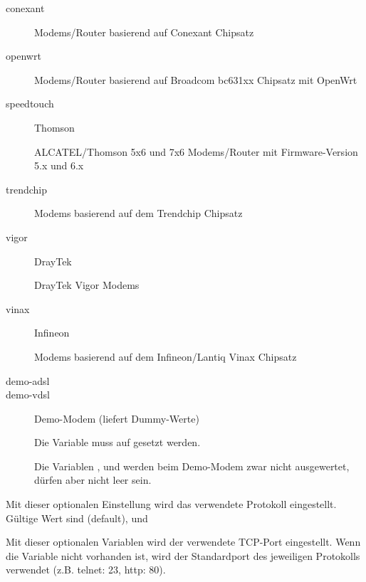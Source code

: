 \begin{description}
\begin{description}
\item[conexant] 

  Modems/Router basierend auf Conexant Chipsatz

\item[openwrt] 

  Modems/Router basierend auf Broadcom bc631xx Chipsatz mit OpenWrt

\item[speedtouch] Thomson 

  ALCATEL/Thomson 5x6 und 7x6 Modems/Router mit Firmware-Version 5.x und 6.x

\item[trendchip] 

  Modems basierend auf dem Trendchip Chipsatz

\item[vigor] DrayTek 

  DrayTek Vigor Modems

\item[vinax] Infineon 

  Modems basierend auf dem Infineon/Lantiq Vinax Chipsatz

\item[demo-adsl]
\item[demo-vdsl] Demo-Modem (liefert Dummy-Werte)

  Die Variable 
  muss auf  gesetzt werden.

  Die Variablen ,
   und
   werden beim Demo-Modem
  zwar nicht ausgewertet, dürfen aber nicht leer sein.
\end{description}


  Mit dieser optionalen Einstellung wird das verwendete Protokoll eingestellt.
  Gültige Wert sind  (default),  und  


  Mit dieser optionalen Variablen wird der verwendete TCP-Port eingestellt.
  Wenn die Variable nicht vorhanden ist, wird der Standardport des jeweiligen 
  Protokolls verwendet (z.B. telnet: 23, http: 80). 
  

\end{description}
